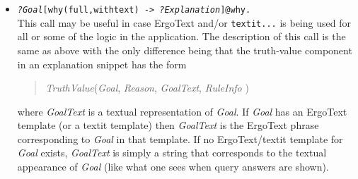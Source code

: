 \begin{itemize}
{\begin{verbatim}
?- ${Bob[vacationdays->?V]}[why(full)->?E]@\why.
?V = 20
?E = explanation(
         true(${Bob[vacationdays->20]@main},'top query',ruleid(null,null,main)),
                [explanation(true(${Bob:employee@main},'base fact',
                               ruleid(null,null,null)),[]),
                 explanation(true(${employee[|vacationdays->20|]@main},'base fact',
                               ruleid(null,null,null)),[])])

?- ${Mary[vacationdays->?V]}[why(full)->?E]@\why.
?V = 25
?E = explanation(
         true(${Mary[vacationdays->25]@main},'top query',ruleid(null,null,null)),
                 [explanation(true(${Mary[vacationdays->25]@main},'base fact',
                  ruleid(null,null,null)),[])])
\end{verbatim}
  }
  As in the previous example, all inference is done without the use of
  rules so that part of the explanation is null.
Note, on the other hand,
how the first explanation shows the inheritance of vacation days from the
class \texttt{employee}  in case of
Bob and that the second explanation shows that
inheritance is not used in case of Mary because her
information about vacation days is explicit and overrides what is inherited
from her superclass.


\item  \texttt{\textnormal{\emph{?Goal}}[why(full,withtext) -> \texttt{\textnormal{\emph{?Explanation}}}]@\bs{}why.}
  \\
  This call may be useful in case ErgoText and/or \texttt{textit{...}} 
  is being used for all or some of
  the logic in the application.
  The description of this call is the same as above with the only
  difference being that the truth-value component in an explanation snippet
  has the form
  \begin{quote}
      \emph{TruthValue}(\emph{Goal}, \emph{Reason}, \emph{GoalText}, \emph{RuleInfo} )
  \end{quote}
  where \emph{GoalText} is a textual representation of \emph{Goal}. If \emph{Goal}
  has an ErgoText template (or a textit template)
  then \emph{GoalText} is the ErgoText phrase
  corresponding to \emph{Goal} in that template. If no ErgoText/textit
  template for \emph{Goal} exists,
  \emph{GoalText} is simply a string that corresponds to the textual
  appearance of \emph{Goal} (like what one sees when query answers are
  shown). 


\end{itemize}

